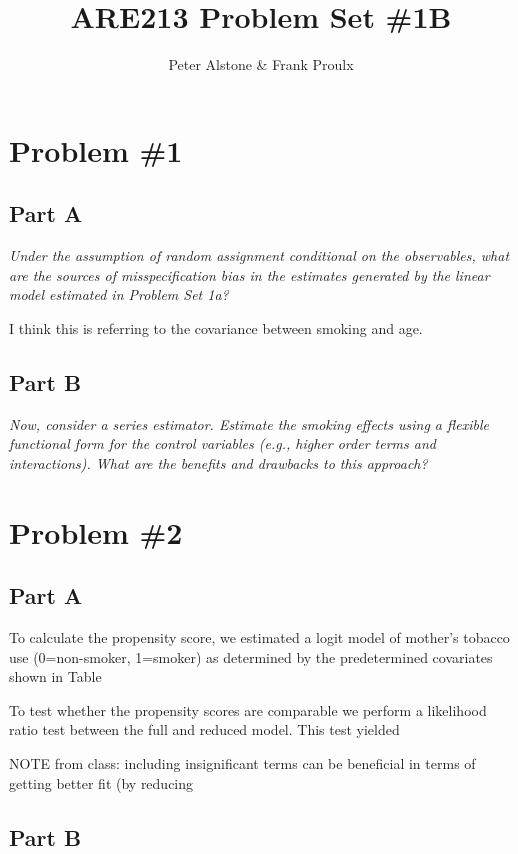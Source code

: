\documentclass[letterpaper, 12pt]{article}
\begin{document}
\title{ARE213 Problem Set \#1B}
\author{Peter Alstone \& Frank Proulx}
\maketitle

\section{Problem \#1}
\subsection{Part A}
\emph{Under the assumption of random assignment conditional on the observables, what are the sources of misspecification bias in the estimates generated by the linear model estimated in Problem Set 1a?}

I think this is referring to the covariance between smoking and age.




\subsection{Part B}
\emph{Now, consider a series estimator. Estimate the smoking effects using a flexible functional form for the control variables (e.g., higher order terms and interactions). What are the benefits and drawbacks to this approach?}
 

\section{Problem \#2}
\subsection{Part A}

To calculate the propensity score, we estimated a logit model of mother's tobacco use (0=non-smoker, 1=smoker) as determined by the predetermined covariates shown in Table %



To test whether the propensity scores are comparable we perform a likelihood ratio test between the full and reduced model. This test yielded 

NOTE from class: including insignificant terms can be beneficial in terms of getting better fit (by reducing 



\subsection{Part B}
\end{document}
